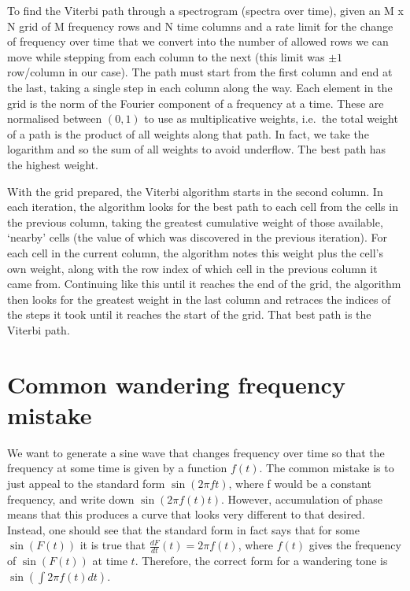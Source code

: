 \documentclass[prb,preprint]{revtex4-1}
\begin{document}
To find the Viterbi path through a spectrogram (spectra over time), given an M x N grid of M frequency rows and N time columns and a rate limit for the change of frequency over time that we convert into the number of allowed rows we can move while stepping from each column to the next (this limit was $\pm 1$ row/column in our case). The path must start from the first column and end at the last, taking a single step in each column along the way. Each element in the grid is the norm of the Fourier component of a frequency at a time. These are normalised between $(0, 1)$ to use as multiplicative weights, i.e.\ the total weight of a path is the product of all weights along that path. In fact, we take the logarithm and so the sum of all weights to avoid underflow. The best path has the highest weight.


With the grid prepared, the Viterbi algorithm starts in the second column. In each iteration, the algorithm looks for the best path to each cell from the cells in the previous column, taking the greatest cumulative weight of those available, ‘nearby’ cells (the value of which was discovered in the previous iteration).
For each cell in the current column, the algorithm notes this weight plus the cell’s own weight, along with the row index of which cell in the previous column it came from.
Continuing like this until it reaches the end of the grid, the algorithm then looks for the greatest weight in the last column and retraces the indices of the steps it took until it reaches the start of the grid. That best path is the Viterbi path.


\section{Common wandering frequency mistake}
\label{app:phase_gotcha}

We want to generate a sine wave that changes frequency over time so that the frequency at some time is given by a function $f(t)$. The common mistake is to just appeal to the standard form $\sin{(2 \pi f t)}$, where f would be a constant frequency, and write down $\sin{(2 \pi f(t) t)}$. However, accumulation of phase means that this produces a curve that looks very different to that desired. Instead, one should see that the standard form in fact says that for some $\sin{(F(t))}$ it is true that $\frac{dF}{dt}(t) = 2 \pi f(t)$, where $f(t)$ gives the frequency of $\sin{(F(t))}$ at time $t$. Therefore, the correct form for a wandering tone is $\sin{(\int{2 \pi f(t) dt})}$.
\end{document}
